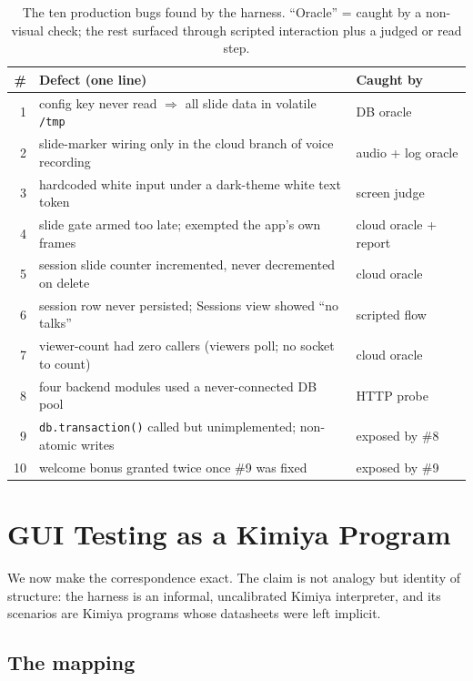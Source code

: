 \documentclass[acmsmall,screen,nonacm]{acmart}
\theoremstyle{acmdefinition}%
\theoremstyle{acmplain}%
\begin{document}
\begin{table}[t]\small
\caption{The ten production bugs found by the harness. ``Oracle'' = caught
by a non-visual check; the rest surfaced through scripted interaction plus
a judged or read step.}
\label{tab:bugs}
\begin{tabular}{@{}rll@{}}
\toprule
\# & Defect (one line) & Caught by \\
\midrule
1 & config key never read $\Rightarrow$ all slide data in volatile \texttt{/tmp} & DB oracle \\
2 & slide-marker wiring only in the cloud branch of voice recording & audio + log oracle \\
3 & hardcoded white input under a dark-theme white text token & screen judge \\
4 & slide gate armed too late; exempted the app's own frames & cloud oracle + report \\
5 & session slide counter incremented, never decremented on delete & cloud oracle \\
6 & session row never persisted; Sessions view showed ``no talks'' & scripted flow \\
7 & viewer-count had zero callers (viewers poll; no socket to count) & cloud oracle \\
8 & four backend modules used a never-connected DB pool & HTTP probe \\
9 & \texttt{db.transaction()} called but unimplemented; non-atomic writes & exposed by \#8 \\
10 & welcome bonus granted twice once \#9 was fixed & exposed by \#9 \\
\bottomrule
\end{tabular}
\end{table}

\section{GUI Testing as a Kimiya Program}
\label{sec:as-kimiya}

We now make the correspondence exact. The claim is not analogy but
identity of structure: the harness is an informal, uncalibrated Kimiya
interpreter, and its scenarios are Kimiya programs whose datasheets were
left implicit.

\subsection{The mapping}
\label{sec:mapping}
\end{document}
